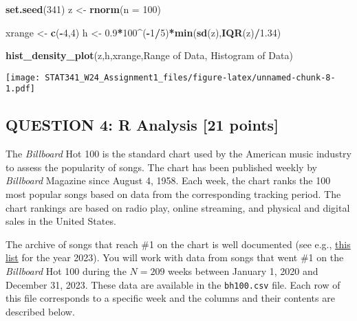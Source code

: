 \documentclass[
]{article}
\newenvironment{Shaded}{\begin{snugshade}}{\end{snugshade}}
\newcommand{\AttributeTok}[1]{\textcolor[rgb]{0.13,0.29,0.53}{#1}}
\newcommand{\DecValTok}[1]{\textcolor[rgb]{0.00,0.00,0.81}{#1}}
\newcommand{\FloatTok}[1]{\textcolor[rgb]{0.00,0.00,0.81}{#1}}
\newcommand{\FunctionTok}[1]{\textcolor[rgb]{0.13,0.29,0.53}{\textbf{#1}}}
\newcommand{\NormalTok}[1]{#1}
\newcommand{\OtherTok}[1]{\textcolor[rgb]{0.56,0.35,0.01}{#1}}
\newcommand{\SpecialCharTok}[1]{\textcolor[rgb]{0.81,0.36,0.00}{\textbf{#1}}}
\newcommand{\StringTok}[1]{\textcolor[rgb]{0.31,0.60,0.02}{#1}}
\begin{document}
\begin{Shaded}
\begin{Highlighting}[]
\FunctionTok{set.seed}\NormalTok{(}\DecValTok{341}\NormalTok{)}
\NormalTok{z }\OtherTok{\textless{}{-}} \FunctionTok{rnorm}\NormalTok{(}\AttributeTok{n =} \DecValTok{100}\NormalTok{)}

\NormalTok{xrange }\OtherTok{\textless{}{-}} \FunctionTok{c}\NormalTok{(}\SpecialCharTok{{-}}\DecValTok{4}\NormalTok{,}\DecValTok{4}\NormalTok{)}
\NormalTok{h }\OtherTok{\textless{}{-}} \FloatTok{0.9}\SpecialCharTok{*}\DecValTok{100}\SpecialCharTok{\^{}}\NormalTok{(}\SpecialCharTok{{-}}\DecValTok{1}\SpecialCharTok{/}\DecValTok{5}\NormalTok{)}\SpecialCharTok{*}\FunctionTok{min}\NormalTok{(}\FunctionTok{sd}\NormalTok{(z),}\FunctionTok{IQR}\NormalTok{(z)}\SpecialCharTok{/}\FloatTok{1.34}\NormalTok{)}

\FunctionTok{hist\_density\_plot}\NormalTok{(z,h,xrange,}\StringTok{\textquotesingle{}Range of Data\textquotesingle{}}\NormalTok{, }\StringTok{\textquotesingle{}Histogram of Data\textquotesingle{}}\NormalTok{)}
\end{Highlighting}
\end{Shaded}

\texttt{[image: STAT341\_W24\_Assignment1\_files/figure-latex/unnamed-chunk-8-1.pdf]}

\newpage

\hypertarget{question-4-r-analysis-21-points}{%
\subsection{QUESTION 4: R Analysis {[}21
points{]}}\label{question-4-r-analysis-21-points}}

The \emph{Billboard} Hot 100 is the standard chart used by the American
music industry to assess the popularity of songs. The chart has been
published weekly by \emph{Billboard} Magazine since August 4, 1958. Each
week, the chart ranks the 100 most popular songs based on data from the
corresponding tracking period. The chart rankings are based on radio
play, online streaming, and physical and digital sales in the United
States.

The archive of songs that reach \#1 on the chart is well documented (see
e.g.,
\href{https://en.wikipedia.org/wiki/List_of_Billboard_Hot_100_number_ones_of_2023}{this
list} for the year 2023). You will work with data from songs that went
\#1 on the \emph{Billboard} Hot 100 during the \(N = 209\) weeks between
January 1, 2020 and December 31, 2023. These data are available in the
\texttt{bh100.csv} file. Each row of this file corresponds to a specific
week and the columns and their contents are described below.
\end{document}
